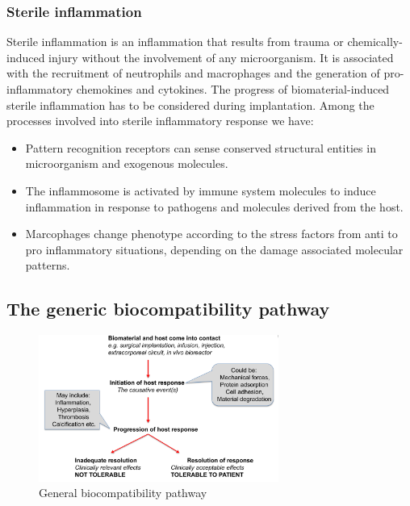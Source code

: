 		\subsubsection{Sterile inflammation}
		Sterile inflammation is an inflammation that results from trauma or chemically-induced injury without the involvement of any microorganism.
		It is associated with the recruitment of neutrophils and macrophages and the generation of pro-inflammatory chemokines and cytokines.
		The progress of biomaterial-induced sterile inflammation has to be considered during implantation.
		Among the processes involved into sterile inflammatory response we have:

		\begin{multicols}{2}
			\begin{itemize}
				\item Pattern recognition receptors can sense conserved structural entities in microorganism and exogenous molecules.
				\item The inflammosome is activated by immune system molecules to induce inflammation in response to pathogens and molecules derived from the host.
				\item Marcophages change phenotype according to the stress factors from anti to pro inflammatory situations, depending on the damage associated molecular patterns.
			\end{itemize}
		\end{multicols}

	\subsection{The generic biocompatibility pathway}

	\begin{figure}[ht]
		\centering
		\includegraphics[width=0.7\textwidth]{biocomp_pathway.png}
		\caption{General biocompatibility pathway}
		\label{fig:biocomp_path}
	\end{figure}


